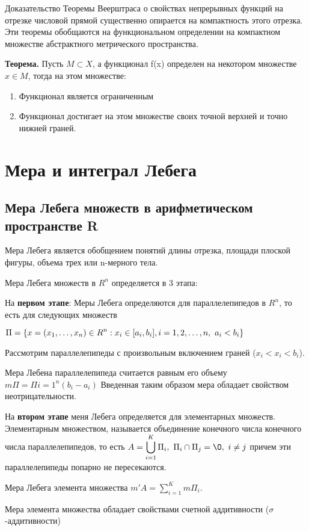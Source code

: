 \documentclass[12pt]{report}
\newcommand{\be}{\begin{enumerate}}
\newcommand{\ee}{\end{enumerate}}
\renewcommand{\[}{$\\\displaystyle}
\renewcommand{\]}{\\$}
\renewcommand{\[}{$\\\displaystyle}
\newcommand{\sep}{,\ }
\newcommand{\tth}[1][]{\textbf{Теорема#1.}}
\begin{document}
Доказательство Теоремы Веерштраса о свойствах непрерывных функций на отрезке числовой прямой существенно опирается на компактность этого отрезка. Эти теоремы обобщаются на функциональном определении на компактном множестве абстрактного метрического пространства.

\tth[] Пусть $M\subset X$, а функционал f(x) определен на некотором множестве $x \in M$, тогда на этом множестве:

\be
  \item Функционал является ограниченным
  \item Функционал достигает на этом множестве своих точной верхней и точно нижней граней.
\ee

\chapter{Мера и интеграл Лебега}

\section{Мера Лебега множеств в арифметическом пространстве R}

Мера Лебега является обобщением понятий длины отрезка, площади плоской фигуры, объема трех или n-мерного тела.

Мера Лебега множеств в $R^n$ определяется в 3 этапа:

На \textbf{первом этапе}: Меры Лебега определяются для параллелепипедов в $R^n$, то есть для следующих множеств

\[
  \Pi = \{x=(x_1,\dots,x_n)\in R^n: x_i\in [a_i,b_i], i=1,2,\dots,n\sep a_i<b_i\}
\]

Рассмотрим параллелепипеды с произвольным включением граней ($x_i<x_i<b_i$).

Мера Лебена параллелепипеда считается равным его объему $m\Pi = \Pi{i=1}^n(b_i-a_i)$ Введенная таким образом мера обладает свойством неотрицательности.

На \textbf{втором этапе} меня Лебега определяется для элементарных множеств. Элементарным множеством, называется объединение конечного числа конечного числа параллелепипедов, то есть
\[
  A=\bigcup _{i=1}^K {\Pi}_i\sep{\Pi}_i \cap {\Pi}_j = \O\sep i\neq j
\]
причем эти параллелепипеды попарно не пересекаются.

Мера Лебега элемента множества $m'A=\sum_{i=1}^Km\Pi_i$.

Мера элемента множества обладает свойствами счетной аддитивности ($\sigma$-аддитивности)
\end{document}
